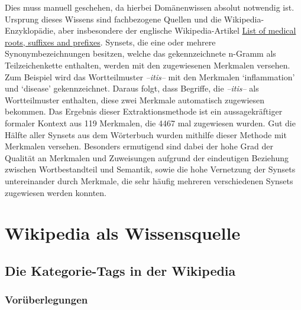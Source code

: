 \documentclass[pagesize,DIV=calc,12pt,draft]{scrreprt}
\begin{document}
Dies muss manuell geschehen, da hierbei Domänenwissen absolut notwendig ist. 
Ursprung dieses Wissens sind fachbezogene Quellen und die Wikipedia-Enzyklopädie, aber insbesondere der englische Wikipedia-Artikel \href{http://en.wikipedia.org/wiki/List_of_medical_roots,_suffixes_and_prefixes}{List of medical roots, suffixes and prefixes}. 
Synsets, die eine oder mehrere Synonymbezeichnungen besitzen, welche das gekennzeichnete n-Gramm als Teilzeichenkette enthalten, werden mit den zugewiesenen Merkmalen versehen. 
Zum Beispiel wird das Wortteilmuster \emph{--itis--} mit den Merkmalen `inflammation' und `disease' gekennzeichnet. 
Daraus folgt, dass Begriffe, die \emph{--itis--} als Wortteilmuster enthalten, diese zwei Merkmale automatisch zugewiesen bekommen. 
Das Ergebnis dieser Extraktionsmethode ist ein aussagekräftiger formaler Kontext aus 119 Merkmalen, die 4467 mal zugewiesen wurden. 
Gut die Hälfte aller Synsets aus dem Wörterbuch wurden mithilfe dieser Methode mit Merkmalen versehen. 
Besonders ermutigend sind dabei der hohe Grad der Qualität an Merkmalen und Zuweisungen aufgrund der eindeutigen Beziehung zwischen Wortbestandteil und Semantik, sowie die hohe Vernetzung der Synsets untereinander durch Merkmale, die sehr häufig mehreren verschiedenen Synsets zugewiesen werden konnten. 

\section{Wikipedia als Wissensquelle}

\subsection{Die Kategorie-Tags in der Wikipedia}

\subsubsection{Vorüberlegungen}
\end{document}
